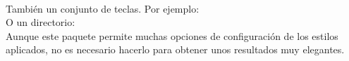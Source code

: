 \\

\noindent También un conjunto de teclas. Por ejemplo:
\\

\noindent O un directorio:
\\

\noindent Aunque este paquete permite muchas opciones de configuración de los estilos aplicados, no es necesario hacerlo para obtener unos resultados muy elegantes.
